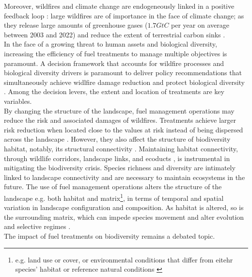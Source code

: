 %
Moreover, wildfires and climate change are endogeneously linked in a positive feedback loop : large wildfires are of importance in the face of climate change; as they release large amounts of greenhouse gases ($1.7GtC$ per year on average between 2003 and 2022) and reduce the extent of terrestrial carbon sinks \citep{zheng_record-high_2023, friedlingstein_2023}. \\
\hspace*{1.5em}In the face of a growing threat to human assets and biological diversity, increasing the efficiency of fuel treatments to manage multiple objectives is paramount. A decision framework that accounts for wildfire processes and biological diversity drivers is paramount to deliver policy recommendations that simultaneously achieve widlfire damage reduction and protect biological diversity \citep{driscoll_resolving_2010}. Among the decision levers, the extent and location of treatments are key variables. 
%
\\
By changing the structure of the landscape, fuel management operations may reduce the risk and associated damages of wildfires. Treatments achieve larger risk reduction when located close to the values at risk instead of being dispersed across the landscape \citep{ager_modeling_2007, Williams2017,Florec2020}. However, they also affect the structure of biodiversity habitat, notably, its structural connectivity \citep{Taylor93}. Maintaining habitat connectivity, through wildlife corridors, landscape links, and ecoducts \citep{Turner2005, Turner2011}, is instrumental in mitigating the biodiversity crisis. Species richness and diversity are intimately linked to landscape connectivity \citep{Olds2012, tian_assessing_2017, velazquez_structural_2019} and are necessary to maintain ecosystems in the future. 
The use of fuel management operations alters the structure of the landscape e.g. both habitat and matrix\footnote{e.g. land use or cover, or environmental conditions that differ from eitehr species' habitat or reference natural conditions \citep{fletcher_prominent_2024}}, in terms of temporal and spatial variation in landscape configuration and composition. As habitat is altered, so is the surrounding matrix, which can impede species movement \citep{eycott_meta-analysis_2012, kuefler_conflicting_2010} and alter evolution and selective regimes \citep{cheptou_adaptation_2017}.\\
The impact of fuel treatments on biodiversity remains a debated topic. 
